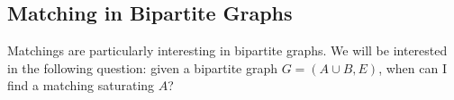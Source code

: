 \documentclass[a4paper]{scrartcl}
\begin{document}
\subsection{Matching in Bipartite Graphs}

Matchings are particularly interesting in bipartite graphs. We will be interested in the following question: given a bipartite graph $G = (A \cup B, E)$, when can I find a matching saturating $A$?

\begin{center}
	


\begin{tikzpicture}[x=0.75pt,y=0.75pt,yscale=-1,xscale=1]


\end{tikzpicture}
\end{center}
\end{document}
